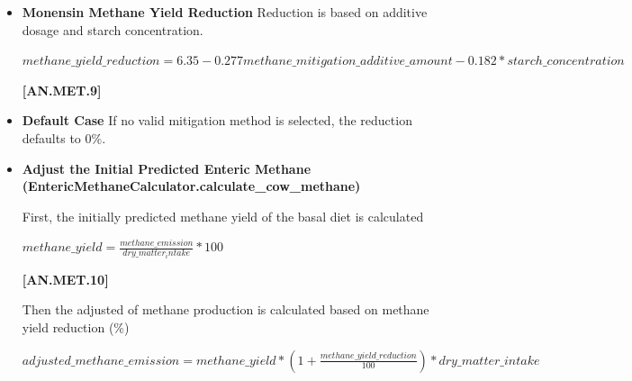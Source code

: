 \documentclass{article}
\begin{document}
\begin{refsection}
\begin{itemize}
            {\raggedleft \textbf{[AN.MET.8]}\par}
            \vspace{0.5cm}
            
        \item \textbf{Monensin Methane Yield Reduction}
Reduction is based on additive dosage and starch concentration.
\vspace{0.2cm}

    \begin{center}
        \(methane\_yield\_reduction = 6.35 - 0.277 methane\_mitigation\_additive\_amount 
	-0.182 * starch\_concentration\)
    \end{center}
        \vspace{0.5cm} 
    
            {\raggedleft \textbf{[AN.MET.9]}\par}
            \vspace{0.5cm}

        \item \textbf{Default Case} If no valid mitigation method is selected, the reduction defaults to 0\%.
        
        \item \textbf{Adjust the Initial Predicted Enteric Methane (EntericMethaneCalculator.calculate\_cow\_methane)}
        
First, the initially predicted methane yield of the basal diet is calculated 
\vspace{0.2cm}

    \begin{center}
        \(methane\_yield = \frac{methane\_emission}{dry\_matter_intake}*100\)
    \end{center}
        \vspace{0.5cm} 
    
            {\raggedleft \textbf{[AN.MET.10]}\par}
            \vspace{0.5cm}

Then the adjusted of methane production is calculated based on methane yield reduction (\%) 
\vspace{0.2cm}

    \begin{center}
        \(adjusted\_methane\_emission = methane\_yield * (1 + \frac{methane\_yield\_reduction}{100}) * dry\_matter\_intake\)
    \end{center}
        \vspace{0.5cm} 
    

\end{itemize}
\end{refsection}
\end{document}
